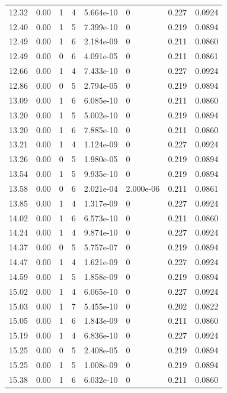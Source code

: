 \documentclass[preview]{standalone}
\begin{document}
{{{\begin{tabular}{L{1.2cm}C{1.2cm} C{0.3cm}C{0.5cm} C{1.4cm}C{1.4cm} C{1.4cm}C{1.4cm}}
  12.32  &  0.00  & 1     &  4 &  5.664e-10  & 0  & 0.227 &  0.0924   \\ 
  12.40  &  0.00  & 1     &  5 &  7.399e-10  & 0  & 0.219 &  0.0894   \\ 
  12.49  &  0.00  & 1     &  6 &  2.184e-09  & 0  & 0.211 &  0.0860   \\ 
  12.49  &  0.00  & 0     &  6 &  4.091e-05  & 0  & 0.211 &  0.0861   \\ 
  12.66  &  0.00  & 1     &  4 &  7.433e-10  & 0  & 0.227 &  0.0924   \\ 
  12.86  &  0.00  & 0     &  5 &  2.794e-05  & 0  & 0.219 &  0.0894   \\ 
  13.09  &  0.00  & 1     &  6 &  6.085e-10  & 0  & 0.211 &  0.0860   \\ 
  13.20  &  0.00  & 1     &  5 &  5.002e-10  & 0  & 0.219 &  0.0894   \\ 
  13.20  &  0.00  & 1     &  6 &  7.885e-10  & 0  & 0.211 &  0.0860   \\ 
  13.21  &  0.00  & 1     &  4 &  1.124e-09  & 0  & 0.227 &  0.0924   \\ 
  13.26  &  0.00  & 0     &  5 &  1.980e-05  & 0  & 0.219 &  0.0894   \\ 
  13.54  &  0.00  & 1     &  5 &  9.935e-10  & 0  & 0.219 &  0.0894   \\ 
  13.58  &  0.00  & 0     &  6 &  2.021e-04  & 2.000e-06  & 0.211 &  0.0861   \\ 
  13.85  &  0.00  & 1     &  4 &  1.317e-09  & 0  & 0.227 &  0.0924   \\ 
  14.02  &  0.00  & 1     &  6 &  6.573e-10  & 0  & 0.211 &  0.0860   \\ 
  14.24  &  0.00  & 1     &  4 &  9.874e-10  & 0  & 0.227 &  0.0924   \\ 
  14.37  &  0.00  & 0     &  5 &  5.757e-07  & 0  & 0.219 &  0.0894   \\ 
  14.47  &  0.00  & 1     &  4 &  1.621e-09  & 0  & 0.227 &  0.0924   \\ 
  14.59  &  0.00  & 1     &  5 &  1.858e-09  & 0  & 0.219 &  0.0894   \\ 
  15.02  &  0.00  & 1     &  4 &  6.065e-10  & 0  & 0.227 &  0.0924   \\ 
  15.03  &  0.00  & 1     &  7 &  5.455e-10  & 0  & 0.202 &  0.0822   \\ 
  15.05  &  0.00  & 1     &  6 &  1.843e-09  & 0  & 0.211 &  0.0860   \\ 
  15.19  &  0.00  & 1     &  4 &  6.836e-10  & 0  & 0.227 &  0.0924   \\ 
  15.25  &  0.00  & 0     &  5 &  2.408e-05  & 0  & 0.219 &  0.0894   \\ 
  15.25  &  0.00  & 1     &  5 &  1.008e-09  & 0  & 0.219 &  0.0894   \\ 
  15.38  &  0.00  & 1     &  6 &  6.032e-10  & 0  & 0.211 &  0.0860   \\ 
\hline 
\end{tabular} 

}}}
\end{document}
